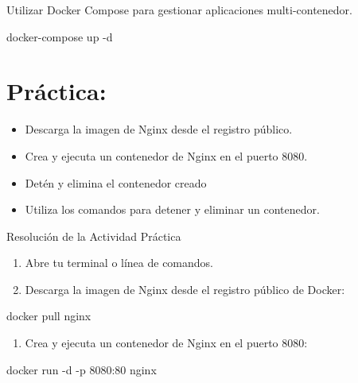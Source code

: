 \documentclass[
  a4paper,
  DIV=11,
  numbers=noendperiod,
  onepage,
  openany]{scrreprt}
\newenvironment{Shaded}{\begin{snugshade}}{\end{snugshade}}
\newcommand{\AttributeTok}[1]{\textcolor[rgb]{0.40,0.45,0.13}{#1}}
\newcommand{\ExtensionTok}[1]{\textcolor[rgb]{0.00,0.23,0.31}{#1}}
\newcommand{\NormalTok}[1]{\textcolor[rgb]{0.00,0.23,0.31}{#1}}
\providecommand{\tightlist}{%
  \setlength{\itemsep}{0pt}\setlength{\parskip}{0pt}}\usepackage{longtable,booktabs,array}
\begin{document}
Utilizar Docker Compose para gestionar aplicaciones multi-contenedor.

\begin{Shaded}
\begin{Highlighting}[]
\ExtensionTok{docker{-}compose}\NormalTok{ up }\AttributeTok{{-}d}
\end{Highlighting}
\end{Shaded}

\section{Práctica:}\label{pruxe1ctica}

\begin{itemize}
\tightlist
\item
  Descarga la imagen de Nginx desde el registro público.
\item
  Crea y ejecuta un contenedor de Nginx en el puerto 8080.
\item
  Detén y elimina el contenedor creado
\item
  Utiliza los comandos para detener y eliminar un contenedor.
\end{itemize}

Resolución de la Actividad Práctica

\begin{enumerate}
\def\labelenumi{\arabic{enumi}.}
\tightlist
\item
  Abre tu terminal o línea de comandos.
\item
  Descarga la imagen de Nginx desde el registro público de Docker:
\end{enumerate}

\begin{Shaded}
\begin{Highlighting}[]
\ExtensionTok{docker}\NormalTok{ pull nginx}
\end{Highlighting}
\end{Shaded}

\begin{enumerate}
\def\labelenumi{\arabic{enumi}.}
\setcounter{enumi}{2}
\tightlist
\item
  Crea y ejecuta un contenedor de Nginx en el puerto 8080:
\end{enumerate}

\begin{Shaded}
\begin{Highlighting}[]
\ExtensionTok{docker}\NormalTok{ run }\AttributeTok{{-}d} \AttributeTok{{-}p}\NormalTok{ 8080:80 nginx}
\end{Highlighting}
\end{Shaded}
\end{document}
